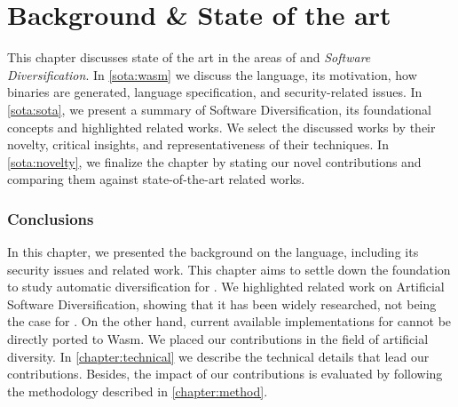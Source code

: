 \chapter{Background \& State of the art}

This chapter discusses state of the art in the areas of \emph{\wasm} and \emph{Software Diversification}. In \autoref{sota:wasm} we discuss the \wasm language, its motivation, how \wasm binaries are generated, language specification, and security-related issues. In \autoref{sota:sota}, we present a summary of Software Diversification, its foundational concepts and highlighted related works.  
We select the discussed works by their novelty, critical insights, and representativeness of their techniques. 
In \autoref{sota:novelty}, we finalize the chapter by stating our novel contributions and comparing them against state-of-the-art related works.







\subsection*{Conclusions}
In this chapter, we presented the background on the \wasm language, including its security issues and related work.
This chapter aims to settle down the foundation to study automatic diversification for \wasm. 
We highlighted related work on Artificial Software Diversification, showing that it has been widely researched, not being the case for \wasm. 
On the other hand, current available implementations for cannot be directly ported to Wasm. 
We placed our contributions in the field of artificial diversity. 
In \autoref{chapter:technical} we describe the technical details that lead our contributions. 
Besides, the impact of our contributions is evaluated by following the methodology described in \autoref{chapter:method}.

